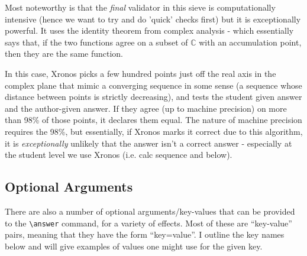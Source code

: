 \documentclass{ximera}
\begin{document}
        Most noteworthy is that the \textit{final} validator in this sieve is computationally intensive (hence we want to try and do 'quick' checks first) but it is exceptionally powerful. It uses the identity theorem from complex analysis - which essentially says that, if the two functions agree on a subset of $\mathbb{C}$ with an accumulation point, then they are the same function.
        
        In this case, Xronos picks a few hundred points just off the real axis in the complex plane that mimic a converging sequence in some sense (a sequence whose distance between points is strictly decreasing), and tests the student given answer and the author-given answer. If they agree (up to machine precision) on more than 98\% of those points, it declares them equal. The nature of machine precision requires the 98\%, but essentially, if Xronos marks it correct due to this algorithm, it is \textit{exceptionally} unlikely that the answer isn't a correct answer - especially at the student level we use Xronos (i.e. calc sequence and below).
        
        


\subsection*{Optional Arguments}

There are also a number of optional arguments/key-values that can be provided to the \verb|\answer| command, for a variety of effects. Most of these are ``key-value'' pairs, meaning that they have the form ``key=value''. I outline the key names below and will give examples of values one might use for the given key.
\end{document}
